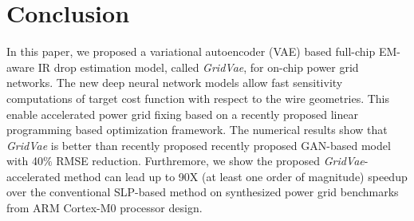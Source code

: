 \documentclass[journal]{IEEEtran}
\begin{document}


\section{Conclusion}
\label{sec:conclusion}
In this paper, we proposed a variational autoencoder (VAE) based
full-chip EM-aware IR drop estimation model, called {\it GridVae}, for
on-chip power grid networks. The new deep neural network models allow
fast sensitivity computations of target cost function with respect to
the wire geometries. This enable accelerated power grid fixing based
on a recently proposed linear programming based optimization
framework.  The numerical results show that {\it GridVae} is better
than recently proposed recently proposed GAN-based model with 40$\%$
RMSE reduction.  Furthremore, we show the proposed {\it
  GridVae}-accelerated method can lead up to 90X (at least one order
of magnitude) speedup over the conventional SLP-based method on
synthesized power grid benchmarks from ARM Cortex-M0 processor design.






%
%
\end{document}
